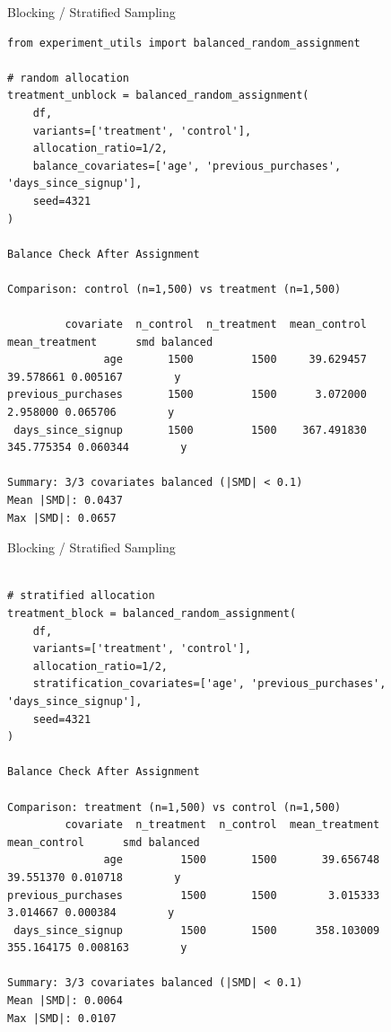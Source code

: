 \documentclass{beamer}
\begin{document}
\begin{frame}[fragile]{Blocking / Stratified Sampling }

\begin{verbatim}
from experiment_utils import balanced_random_assignment

# random allocation
treatment_unblock = balanced_random_assignment(
    df,
    variants=['treatment', 'control'],
    allocation_ratio=1/2,
    balance_covariates=['age', 'previous_purchases', 'days_since_signup'],
    seed=4321
)

Balance Check After Assignment

Comparison: control (n=1,500) vs treatment (n=1,500)

         covariate  n_control  n_treatment  mean_control  mean_treatment      smd balanced
               age       1500         1500     39.629457       39.578661 0.005167        y
previous_purchases       1500         1500      3.072000        2.958000 0.065706        y 
 days_since_signup       1500         1500    367.491830      345.775354 0.060344        y

Summary: 3/3 covariates balanced (|SMD| < 0.1)
Mean |SMD|: 0.0437
Max |SMD|: 0.0657

\end{verbatim}
\end{frame}
\begin{frame}[fragile]{Blocking / Stratified Sampling }

\begin{verbatim}

# stratified allocation
treatment_block = balanced_random_assignment(
    df,
    variants=['treatment', 'control'],
    allocation_ratio=1/2,
    stratification_covariates=['age', 'previous_purchases', 'days_since_signup'],
    seed=4321
)

Balance Check After Assignment

Comparison: treatment (n=1,500) vs control (n=1,500)
         covariate  n_treatment  n_control  mean_treatment  mean_control      smd balanced
               age         1500       1500       39.656748     39.551370 0.010718        y
previous_purchases         1500       1500        3.015333      3.014667 0.000384        y
 days_since_signup         1500       1500      358.103009    355.164175 0.008163        y

Summary: 3/3 covariates balanced (|SMD| < 0.1)
Mean |SMD|: 0.0064
Max |SMD|: 0.0107

\end{verbatim}
\end{frame}
\end{document}
